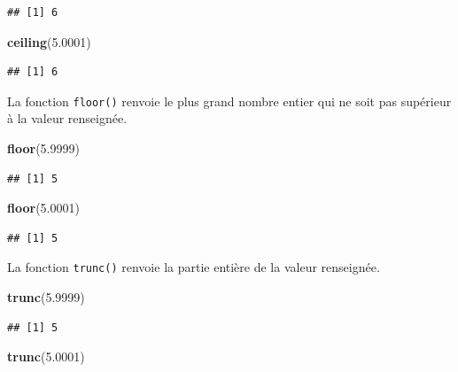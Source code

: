 \documentclass[
]{book}
\newenvironment{Shaded}{\begin{snugshade}}{\end{snugshade}}
\newcommand{\FloatTok}[1]{\textcolor[rgb]{0.00,0.00,0.81}{#1}}
\newcommand{\KeywordTok}[1]{\textcolor[rgb]{0.13,0.29,0.53}{\textbf{#1}}}
\newcommand{\NormalTok}[1]{#1}
\begin{document}
\begin{verbatim}
## [1] 6
\end{verbatim}

\begin{Shaded}
\begin{Highlighting}[]
\KeywordTok{ceiling}\NormalTok{(}\FloatTok{5.0001}\NormalTok{)}
\end{Highlighting}
\end{Shaded}

\begin{verbatim}
## [1] 6
\end{verbatim}

La fonction \texttt{floor()} renvoie le plus grand nombre entier qui ne soit pas supérieur à la valeur renseignée.

\begin{Shaded}
\begin{Highlighting}[]
\KeywordTok{floor}\NormalTok{(}\FloatTok{5.9999}\NormalTok{)}
\end{Highlighting}
\end{Shaded}

\begin{verbatim}
## [1] 5
\end{verbatim}

\begin{Shaded}
\begin{Highlighting}[]
\KeywordTok{floor}\NormalTok{(}\FloatTok{5.0001}\NormalTok{)}
\end{Highlighting}
\end{Shaded}

\begin{verbatim}
## [1] 5
\end{verbatim}

La fonction \texttt{trunc()} renvoie la partie entière de la valeur renseignée.

\begin{Shaded}
\begin{Highlighting}[]
\KeywordTok{trunc}\NormalTok{(}\FloatTok{5.9999}\NormalTok{)}
\end{Highlighting}
\end{Shaded}

\begin{verbatim}
## [1] 5
\end{verbatim}

\begin{Shaded}
\begin{Highlighting}[]
\KeywordTok{trunc}\NormalTok{(}\FloatTok{5.0001}\NormalTok{)}
\end{Highlighting}
\end{Shaded}
\end{document}
